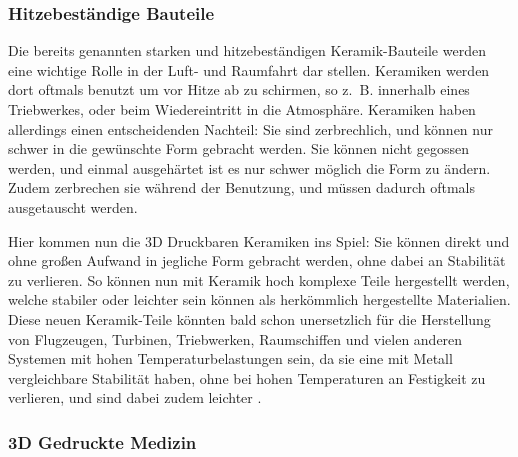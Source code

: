 \subsubsection{Hitzebeständige Bauteile}

Die bereits genannten starken und hitzebeständigen Keramik-Bauteile werden eine wichtige Rolle in der Luft- und Raumfahrt dar stellen. Keramiken werden dort oftmals benutzt um vor Hitze ab zu schirmen, so z.~B. innerhalb eines Triebwerkes, oder beim Wiedereintritt in die Atmosphäre. Keramiken haben allerdings einen entscheidenden Nachteil: Sie sind zerbrechlich, und können nur schwer in die gewünschte Form gebracht werden. Sie können nicht gegossen werden, und einmal ausgehärtet ist es nur schwer möglich die Form zu ändern. Zudem zerbrechen sie während der Benutzung, und müssen dadurch oftmals ausgetauscht werden.

Hier kommen nun die 3D Druckbaren Keramiken ins Spiel: Sie können direkt und ohne großen Aufwand in jegliche Form gebracht werden, ohne dabei an Stabilität zu verlieren. So können nun mit Keramik hoch komplexe Teile hergestellt werden, welche stabiler oder leichter sein können als herkömmlich hergestellte Materialien. Diese neuen Keramik-Teile könnten bald schon unersetzlich für die Herstellung von Flugzeugen, Turbinen, Triebwerken, Raumschiffen und vielen anderen Systemen mit hohen Temperaturbelastungen sein, da sie eine mit Metall vergleichbare Stabilität haben, ohne bei hohen Temperaturen an Festigkeit zu verlieren, und sind dabei zudem leichter \parencite{SPACECeramics}.

\subsubsection{3D Gedruckte Medizin}
